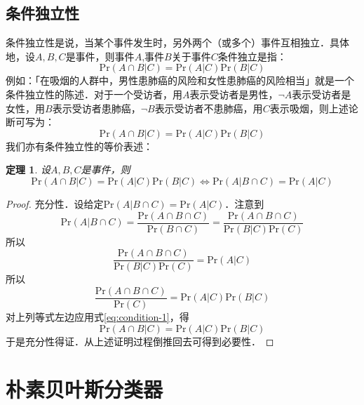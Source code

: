 \documentclass{ctexart}
\newcommand{\pr}{\mathrm{Pr}}
\newtheorem{theorem}{定理}
\begin{document}
    \subsection{条件独立性}
    条件独立性是说，当某个事件发生时，另外两个（或多个）事件互相独立．具体地，设$A,B,C$是事件，则事件$A$,事件$B$关于事件$C$条件独立是指：
    \begin{equation}
        \pr(A \cap B | C) = \pr(A | C) \pr(B | C)
    \end{equation}
    例如：「在吸烟的人群中，男性患肺癌的风险和女性患肺癌的风险相当」就是一个条件独立性的陈述．对于一个受访者，用$A$表示受访者是男性，$\neg A$表示受访者是女性，用$B$表示受访者患肺癌，$\neg B$表示受访者不患肺癌，用$C$表示吸烟，则上述论断可写为：
    \begin{equation}
        \pr(A \cap B | C) = \pr(A | C) \pr(B | C)
    \end{equation}
    我们亦有条件独立性的等价表述：
    \begin{theorem}
        设$A,B,C$是事件，则
        \begin{equation}
            \pr(A \cap B | C) = \pr(A | C) \pr(B | C) \iff \pr(A | B \cap C) = \pr(A | C)
        \end{equation}
    \end{theorem}
    \begin{proof}
        充分性．设给定$\pr(A|B\cap C)=\pr(A|C)$．注意到
        \begin{equation}
            \pr(A | B \cap C) = \frac{\pr(A \cap B \cap C)}{\pr(B \cap C)} = \frac{\pr(A\cap B \cap C)}{\pr(B|C) \pr(C)}
        \end{equation}
        所以
        \begin{equation}
            \frac{\pr(A\cap B \cap C)}{\pr(B|C)\pr(C)} = \pr(A|C)
        \end{equation}
        所以
        \begin{equation}
            \frac{\pr(A \cap B \cap C)}{\pr(C)} = \pr(A|C) \pr(B|C)
        \end{equation}
        对上列等式左边应用式\ref{eq:condition-1}，得
        \begin{equation}
            \pr(A \cap B | C) = \pr(A|C)\pr(B|C)
        \end{equation}
        于是充分性得证．从上述证明过程倒推回去可得到必要性．
    \end{proof}

    \section{朴素贝叶斯分类器}
\end{document}
